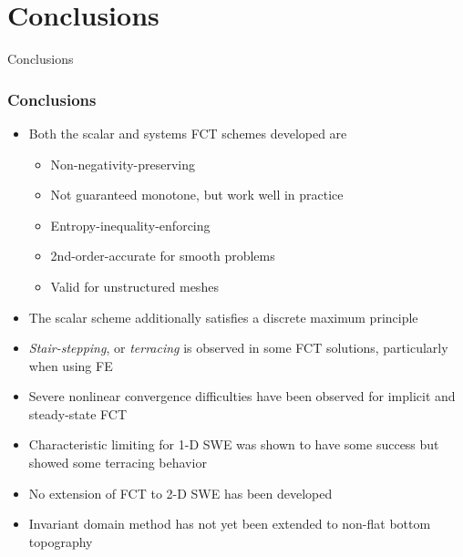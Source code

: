 \section{Conclusions}
\begin{frame}
\begin{center}
  \Huge{\textcolor{myblue}{Conclusions}}
\end{center}
\end{frame}
\begin{frame}
\frametitle{Conclusions}

\begin{itemize}
  \item Both the scalar and systems FCT schemes developed are
    \begin{itemize}
      \item Non-negativity-preserving
      \item Not guaranteed monotone, but work well in practice
      \item Entropy-inequality-enforcing
      \item 2nd-order-accurate for smooth problems
      \item Valid for unstructured meshes
    \end{itemize}
  \item The scalar scheme additionally satisfies a discrete maximum principle
  \item \emph{Stair-stepping}, or \emph{terracing} is observed in some
    FCT solutions, particularly when using FE
  \item Severe nonlinear convergence difficulties have been observed for
    implicit and steady-state FCT
  \item Characteristic limiting for 1-D SWE was shown to have some
    success but showed some terracing behavior
  \item No extension of FCT to 2-D SWE has been developed
  \item Invariant domain method has not yet been extended to non-flat
    bottom topography
\end{itemize}

\end{frame}

